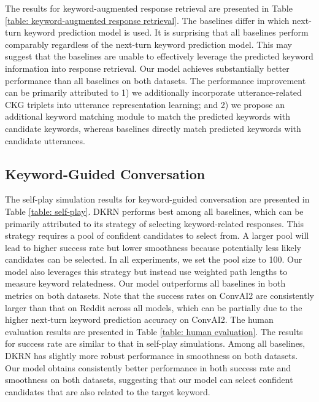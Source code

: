 \documentclass[letterpaper]{article} %
\begin{document}
The results for keyword-augmented response retrieval are presented in Table \ref{table: keyword-augmented response retrieval}. The baselines differ in which next-turn keyword prediction model is used. It is surprising that all baselines perform comparably regardless of the next-turn keyword prediction model. This may suggest that the baselines are unable to effectively leverage the predicted keyword information into response retrieval. Our model achieves substantially better performance than all baselines on both datasets. The performance improvement can be primarily attributed to 1) we additionally incorporate utterance-related CKG triplets into utterance representation learning; and 2) we propose an additional keyword matching module to match the predicted keywords with candidate keywords, whereas baselines directly match predicted keywords with candidate utterances.

\vspace{-0.72mm}
\subsection{Keyword-Guided Conversation}
\label{sec: keyword-guided conversation}
The self-play simulation results for keyword-guided conversation are presented in Table \ref{table: self-play}. DKRN performs best among all baselines, which can be primarily attributed to its strategy of selecting keyword-related responses. This strategy requires a pool of confident candidates to select from. A larger pool will lead to higher success rate but lower smoothness because potentially less likely candidates can be selected. In all experiments, we set the pool size to 100. Our model also leverages this strategy but instead use weighted path lengths to measure keyword relatedness. Our model outperforms all baselines in both metrics on both datasets. Note that the success rates on ConvAI2 are consistently larger than that on Reddit across all models, which can be partially due to the higher next-turn keyword prediction accuracy on ConvAI2.  The human evaluation results are presented in Table \ref{table: human evaluation}. The results for success rate are similar to that in self-play simulations. Among all baselines, DKRN has slightly more robust performance in smoothness on both datasets. Our model obtains consistently better performance in both success rate and smoothness on both datasets, suggesting that our model can select confident candidates that are also related to the target keyword.

\vspace{-0.74mm}
\end{document}
